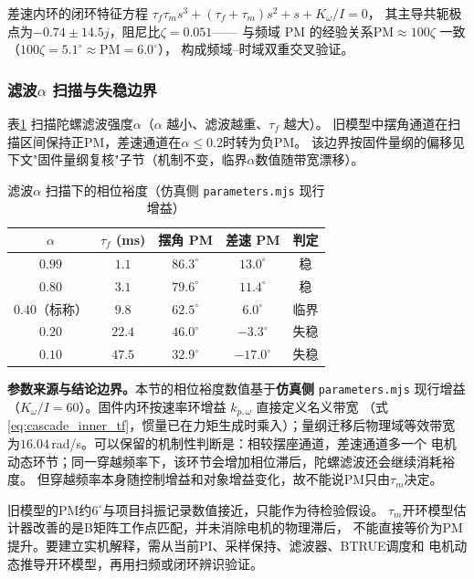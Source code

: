 差速内环的闭环特征方程
$\tau_f\tau_m s^3+(\tau_f+\tau_m)s^2+s+K_\omega/I=0$，
其主导共轭极点为$-0.74\pm 14.5j$，阻尼比$\zeta=0.051$——
与频域 PM 的经验关系$\mathrm{PM}\approx 100\zeta$ 一致（$100\zeta=5.1^\circ \approx \mathrm{PM}=6.0^\circ$），
构成频域–时域双重交叉验证。

\subsubsection{滤波$\alpha$ 扫描与失稳边界}

表\ref{tab:pm_alpha} 扫描陀螺滤波强度$\alpha$（$\alpha$ 越小、滤波越重、$\tau_f$ 越大）。
旧模型中摆角通道在扫描区间保持正PM，差速通道在$\alpha\le0.2$时转为负PM。
该边界按固件量纲的偏移见下文"固件量纲复核"子节（机制不变，临界$\alpha$数值随带宽漂移）。

\begin{table}[htbp]
\centering
\caption{滤波$\alpha$ 扫描下的相位裕度（仿真侧 \texttt{parameters.mjs} 现行增益）}
\label{tab:pm_alpha}
\begin{tabular}{ccccc}
\hline
$\alpha$ & $\tau_f$ (ms) & 摆角 PM & 差速 PM & 判定 \\
\hline
$0.99$ & $1.1$ & $86.3^\circ$ & $13.0^\circ$ & 稳 \\
$0.80$ & $3.1$ & $79.6^\circ$ & $11.4^\circ$ & 稳 \\
$0.40$（标称） & $9.8$ & $62.5^\circ$ & $6.0^\circ$ & 临界 \\
$0.20$ & $22.4$ & $46.0^\circ$ & $-3.3^\circ$ & 失稳 \\
$0.10$ & $47.5$ & $32.9^\circ$ & $-17.0^\circ$ & 失稳 \\
\hline
\end{tabular}
\end{table}

\begin{remark}
\textbf{参数来源与结论边界。}本节的相位裕度数值基于\textbf{仿真侧} \texttt{parameters.mjs}
现行增益（$K_\omega/I=60$）。固件内环按速率环增益 $k_{p,\omega}$ 直接定义名义带宽
（式\ref{eq:cascade_inner_tf}，惯量已在力矩生成时乘入）；量纲迁移后物理域等效带宽
为$16.04$\,rad/s。可以保留的机制性判断是：相较摆座通道，差速通道多一个
电机动态环节；同一穿越频率下，该环节会增加相位滞后，陀螺滤波还会继续消耗裕度。
但穿越频率本身随控制增益和对象增益变化，故不能说PM只由$\tau_m$决定。

旧模型的PM约$6^\circ$与项目抖振记录数值接近，只能作为待检验假设。
$\tau_m$开环模型估计器改善的是B矩阵工作点匹配，并未消除电机的物理滞后，
不能直接等价为PM提升。要建立实机解释，需从当前PI、采样保持、滤波器、BTRUE调度和
电机动态推导开环模型，再用扫频或闭环辨识验证。
\end{remark}

